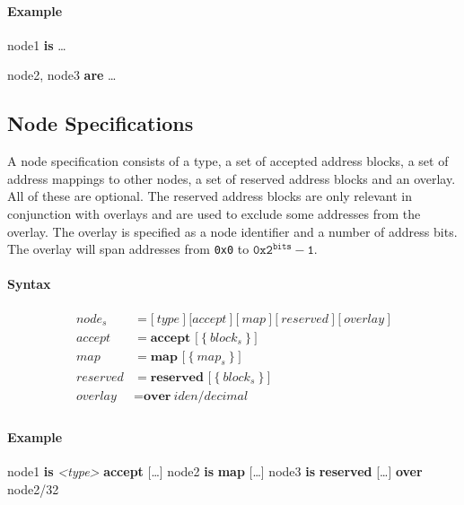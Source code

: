 \documentclass[a4paper,11pt,twoside]{report}
\begin{document}
{{{\clearpage
\paragraph{Example}
\begin{syntax}
    node1 \textbf{is} \ldots

    node2,
    node3 \textbf{are} \ldots
\end{syntax}

\subsection{Node Specifications}
A node specification consists of a type, a set of accepted address blocks, a set of address mappings to other nodes, a set of reserved address blocks and an overlay.
All of these are optional.
The reserved address blocks are only relevant in conjunction with overlays and are used to exclude some addresses from the overlay.
The overlay is specified as a node identifier and a number of address bits.
The overlay will span addresses from \texttt{0x0} to \(\texttt{0x2}^\texttt{bits} - \texttt{1}\).

\paragraph{Syntax}
\begin{align*}
\textit{node}_s & \mathop{=}
    \Big[\ 
       \textit{type}\ 
    \Big]\  
    \Big[
       \textit{accept}\ 
    \Big]\ 
    \Big[\ 
       \textit{map}\ 
    \Big]\ 
    \Big[\ 
        \textit{reserved}\ 
    \Big]\ 
    \Big[\ 
        \textit{overlay}\ 
    \Big]\\
\textit{accept} & \mathop{=}
    \textbf{accept [}\ \big\{\ \textit{block}_s\ \big\}\ \textbf{]}\\
\textit{map} & \mathop{=}
    \textbf{map [}\ \big\{\ \textit{map}_s\ \big\}\ \textbf{]}\\
\textit{reserved} & \mathop{=}
    \textbf{reserved [}\ \big\{\ \textit{block}_s\ \big\}\ \textbf{]}\\
\textit{overlay} & \mathop{=}
    \textbf{over}\ \textit{iden}\textbf{/}\textit{decimal}\\
\end{align*}

\paragraph{Example}
\begin{syntax}
    node1 \textbf{is} \textit{<type>} \textbf{accept} [\ldots]
    node2 \textbf{is} \textbf{map} [\ldots]
    node3 \textbf{is} \textbf{reserved} [\ldots] \textbf{over} node2/32
\end{syntax}

}}}
\end{document}
